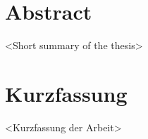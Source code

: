 \ifenglish
    \section*{Abstract}

    <Short summary of the thesis>

\fi
\ifdeutsch
    \section*{Kurzfassung}

    <Kurzfassung der Arbeit>

\fi